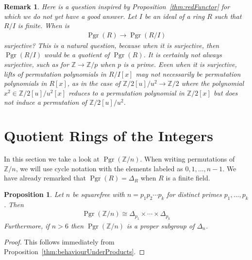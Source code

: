 \documentclass[oneside]{amsart}
\theoremstyle{nthm}
\newtheorem{prop}[subsection]{Proposition}
\theoremstyle{ndef}
\theoremstyle{nrem}
\newtheorem{rem}[subsection]{Remark}
\newcommand{\Z}{\mathbb{Z}}
\DeclareMathOperator{\Pgr}{Pgr}
\begin{document}
\begin{rem}Here is a question inspired by Proposition~\ref{thm:redFunctor} for which we do not yet have a good answer. Let $I$ be an ideal of a ring $R$ such that $R/I$ is finite. When is
    \begin{align*}\Pgr(R)\longrightarrow\Pgr(R/I)
    \end{align*}
    surjective? This is a natural question, because when it is surjective, then $\Pgr(R/I)$ would be a quotient of $\Pgr(R)$. It is certainly not always surjective, such as for $\Z\to \Z/p$ when $p$ is a prime. Even when it is surjective, lifts of permutation polynomials in $R/I[x]$ may not necessarily be permutation polynomials in $R[x]$, as in the case of $\Z/2[u]/u^2\to\Z/2$ where the polynomial $x^2\in \Z/2[u]/u^2[x]$ reduces to a permutation polynomial in $\Z/2[x]$ but does not induce a permutation of $\Z/2[u]/u^2$.\end{rem}

\section{Quotient Rings of the Integers}\label{sec:quotientIntegers}
In this section we take a look at $\Pgr(\Z/n)$. When writing permutations of $\Z/n$, we will use cycle notation with the elements labeled as $0,1,\dots,n-1$. We have already remarked that $\Pgr(R) = \Delta_R$ when $R$ is a finite field. 
\begin{prop}
     Let $n$ be squarefree with $n = p_1p_2\cdots p_k$ for distinct primes $p_1,\dots,p_k$. Then
\begin{align*}
    \Pgr(\Z/n)\cong \Delta_{p_1}\times\cdots \times\Delta_{p_k}
\end{align*}
Furthermore, if $n > 6$ then $\Pgr(\Z/n)$ is a proper subgroup of $\Delta_n$.
\end{prop}
\begin{proof}
    This follows immediately from Proposition~\ref{thm:behaviourUnderProducts}.
\end{proof}
\end{document}
